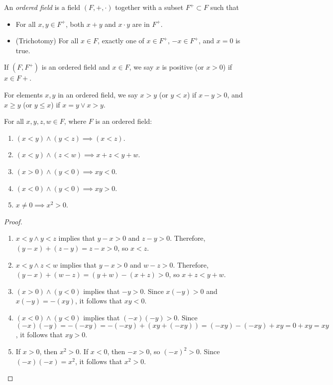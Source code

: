 \documentclass[12pt]{article}
\begin{document}
\begin{defn}
    An \emph{ordered field} is a field $(F, +, \cdot)$ together with a subset $F^+ \subset F$ such that\begin{itemize}
        \item For all $x, y \in F^+$, both $x + y$ and $x \cdot y$ are in $F^+$.
        \item (Trichotomy) For all $x \in F$, exactly one of $x \in F^+$, $-x \in F^+$, and $x = 0$ is true.
    \end{itemize}
\end{defn}

If $(F, F^+)$ is an ordered field and $x \in F$, we say $x$ is positive (or $x > 0$) if $x \in F+$.

\begin{defn}
    For elements $x, y$ in an ordered field, we say $x > y$ (or $y < x$) if $x - y > 0$, and $x \geq y$ (or $y \leq x$) if $x = y \lor x > y$.
\end{defn}

\begin{thm} For all $x, y, z, w \in F$, where $F$ is an ordered field:
    \begin{enumerate}
        \item $(x < y) \land (y < z) \implies (x < z)$.
        \item $(x < y) \land (z < w) \implies x + z < y + w$.
        \item $(x > 0) \land (y < 0) \implies xy < 0$.
        \item $(x < 0) \land (y < 0) \implies xy > 0$.
        \item $x \neq 0 \implies x^2 > 0$.
    \end{enumerate}
\end{thm}

\begin{proof}\proofbreak
    \begin{enumerate}
        \item $x < y \land y < z$ implies that $y - x > 0$ and $z - y > 0$. Therefore, $(y - x) + (z - y) = z - x > 0$, so $x < z$.
        \item $x < y \land z < w$ implies that $y - x > 0$ and $w - z > 0$. Therefore, $(y - x) + (w - z) = (y + w) - (x + z) > 0$, so $x + z < y + w$.
        \item $(x > 0) \land (y < 0)$ implies that $-y > 0$. Since $x(-y) > 0$ and $x(-y) = -(xy)$, it follows that $xy < 0$.
        \item $(x < 0) \land (y < 0)$ implies that $(-x)(-y) > 0$. Since $(-x)(-y) = -(-xy) = -(-xy) + (xy  + (-xy)) = (-xy) - (-xy) + xy = 0 + xy = xy$, it follows that $xy > 0$.
        \item If $x > 0$, then $x^2 > 0$. If $x < 0$, then $-x > 0$, so $(-x)^2 > 0$. Since $(-x)(-x) = x^2$, it follows that $x^2 > 0$.
    \end{enumerate}
\end{proof}
\end{document}
